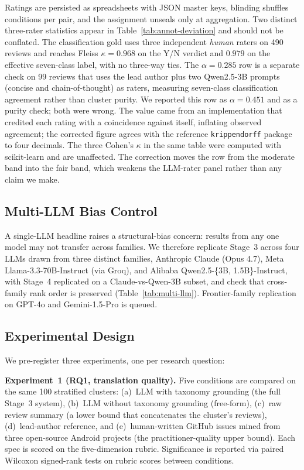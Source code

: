 \documentclass[preprint,12pt]{elsarticle}
\begin{document}
Ratings are persisted as spreadsheets with JSON master keys, blinding shuffles conditions per pair, and the assignment unseals only at aggregation. Two distinct three-rater statistics appear in Table~\ref{tab:annot-deviation} and should not be conflated. The classification gold uses three independent \emph{human} raters on 490 reviews and reaches Fleiss $\kappa = 0.968$ on the Y/N verdict and $0.979$ on the effective seven-class label, with no three-way ties. The $\alpha = 0.285$ row is a separate check on 99 reviews that uses the lead author plus two
Qwen2.5-3B prompts (concise and chain-of-thought) as raters, measuring seven-class classification
agreement rather than cluster purity. We reported this row as $\alpha = 0.451$ and as a purity
check; both were wrong. The value came from an implementation that credited each rating with a
coincidence against itself, inflating observed agreement; the corrected figure agrees with the
reference \texttt{krippendorff} package to four decimals. The three Cohen's $\kappa$ in the same
table were computed with scikit-learn and are unaffected. The correction moves the row from the
moderate band into the fair band, which weakens the LLM-rater panel rather than any claim we make.

\subsection{Multi-LLM Bias Control}\label{multi-llm-setup}
 A single-LLM headline raises a structural-bias concern: results from any one model may not
  transfer across families. We therefore replicate Stage~3 across four LLMs drawn from three
  distinct families, Anthropic Claude (Opus 4.7), Meta Llama-3.3-70B-Instruct (via Groq), and
  Alibaba Qwen2.5-\{3B, 1.5B\}-Instruct, with Stage~4 replicated on a Claude-vs-Qwen-3B subset,
  and check that cross-family rank order is preserved (Table~\ref{tab:multi-llm}).
  Frontier-family replication on GPT-4o and Gemini-1.5-Pro is queued.



\subsection{Experimental Design}
We pre-register three experiments, one per research question:

\textbf{Experiment~1 (RQ1, translation quality).} Five conditions are compared on the same 100 stratified clusters: (a)~LLM with taxonomy grounding (the full Stage~3 system), (b)~LLM without taxonomy grounding (free-form), (c)~raw review summary (a lower bound that concatenates the cluster's reviews), (d)~lead-author reference, and (e)~human-written GitHub issues mined from three open-source Android projects (the practitioner-quality upper bound). Each spec is scored on the five-dimension rubric. Significance is reported via paired Wilcoxon
signed-rank tests on rubric scores between conditions.
\end{document}
